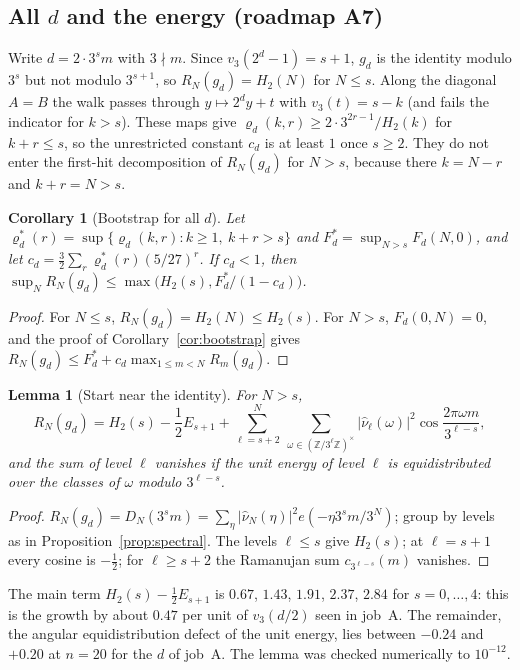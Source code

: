 \documentclass[11pt]{article}
\newtheorem{lemma}[theorem]{Lemma}
\newtheorem{corollary}[theorem]{Corollary}
\theoremstyle{remark}
\newcommand{\Z}{\mathbb Z}
\begin{document}
\subsection*{All $d$ and the energy (roadmap A7)}
Write $d=2\cdot3^sm$ with $3\nmid m$. Since $v_3(2^d-1)=s+1$, $g_d$ is the identity modulo $3^s$ but not modulo $3^{s+1}$, so $R_N(g_d)=H_2(N)$ for $N\le s$. Along the diagonal $A=B$ the walk passes through $y\mapsto2^dy+t$ with $v_3(t)=s-k$ (and fails the indicator for $k>s$). These maps give $\varrho_d(k,r)\ge2\cdot3^{2r-1}/H_2(k)$ for $k+r\le s$, so the unrestricted constant $c_d$ is at least $1$ once $s\ge2$. They do not enter the first-hit decomposition of $R_N(g_d)$ for $N>s$, because there $k=N-r$ and $k+r=N>s$.

\begin{corollary}[Bootstrap for all $d$]\label{cor:bootstrap-all}
Let $\varrho^*_d(r)=\sup\{\varrho_d(k,r):k\ge1,\ k+r>s\}$ and $F^*_d=\sup_{N>s}F_d(N,0)$, and let $c_d=\frac32\sum_r\varrho^*_d(r)(5/27)^r$. If $c_d<1$, then $\sup_NR_N(g_d)\le\max\bigl(H_2(s),F^*_d/(1-c_d)\bigr)$.
\end{corollary}

\begin{proof}
For $N\le s$, $R_N(g_d)=H_2(N)\le H_2(s)$. For $N>s$, $F_d(0,N)=0$, and the proof of Corollary~\ref{cor:bootstrap} gives $R_N(g_d)\le F^*_d+c_d\max_{1\le m<N}R_m(g_d)$.
\end{proof}

\begin{lemma}[Start near the identity]\label{lem:nearid}
For $N>s$,
\[
 R_N(g_d)=H_2(s)-\frac12E_{s+1}+\sum_{\ell=s+2}^N\ \sum_{\omega\in(\Z/3^\ell\Z)^\times}|\widehat\nu_\ell(\omega)|^2\cos\frac{2\pi\omega m}{3^{\ell-s}} ,
\]
and the sum of level $\ell$ vanishes if the unit energy of level $\ell$ is equidistributed over the classes of $\omega$ modulo $3^{\ell-s}$.
\end{lemma}

\begin{proof}
$R_N(g_d)=D_N(3^sm)=\sum_\eta|\widehat\nu_N(\eta)|^2e(-\eta3^sm/3^N)$; group by levels as in Proposition~\ref{prop:spectral}. The levels $\ell\le s$ give $H_2(s)$; at $\ell=s+1$ every cosine is $-\frac12$; for $\ell\ge s+2$ the Ramanujan sum $c_{3^{\ell-s}}(m)$ vanishes.
\end{proof}

The main term $H_2(s)-\frac12E_{s+1}$ is $0.67$, $1.43$, $1.91$, $2.37$, $2.84$ for $s=0,\dots,4$: this is the growth by about $0.47$ per unit of $v_3(d/2)$ seen in job~A. The remainder, the angular equidistribution defect of the unit energy, lies between $-0.24$ and $+0.20$ at $n=20$ for the $d$ of job~A. The lemma was checked numerically to $10^{-12}$.
\end{document}

